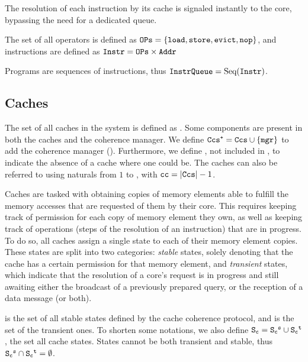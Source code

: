 The resolution of each instruction by its cache is signaled instantly to the
core, bypassing the need for a dedicated queue.

\begin{definition}[Instruction]
The set of all operators is defined as $\text{\texttt{OPs}}{} = \{\text{\texttt{load}}{},
\text{\texttt{store}}{}, \text{\texttt{evict}}{}, \text{\texttt{nop}}{}\}$, and instructions are defined
as $\text{\texttt{Instr}}{} = \text{\texttt{OPs}}{} \times \text{\texttt{Addr}}{}$
\end{definition}

\begin{definition}[Program]
Programs are sequences of instructions, thus $\text{\texttt{InstrQueue}}{} =
\text{Seq}(\text{\texttt{Instr}}{})$.
\end{definition}

\subsection{Caches}
\label{sec:cache_coherence:cache_cmp}
\begin{definition}[Cache]
\label{def:cache}
The set of all caches in the system is defined as \caches{}.  Some components
are present in both the caches and the coherence manager. We define
$\text{\texttt{Ccs\textsuperscript{+}}}{} = \text{\texttt{Ccs}}{} \cup \{\text{\texttt{mgr}}{}\}$ to add the coherence manager
(\cmgr{}). Furthermore, we define \nocache{}, not included in \caches{}, to
indicate the absence of a cache where one could be. The caches can also be
referred to using naturals from $1$ to \cachecount{}, with
$\text{\texttt{cc}}{} = |\text{\texttt{Ccs}}{}| - 1$.
\end{definition}

Caches are tasked with obtaining copies of memory elements able to fulfill the
memory accesses that are requested of them by their core. This requires keeping
track of permission for each copy of memory element they own, as well as
keeping track of operations (steps of the resolution of an instruction) that
are in progress. To do so, all caches assign a single state to each of their
memory element copies. These states are split into two categories:
\textit{stable} states, solely denoting that the cache has a certain permission
for that memory element, and \textit{transient} states, which indicate that the
resolution of a core's request is in progress and still awaiting either the
broadcast of a previously prepared query, or the reception of a data message
(or both).

\begin{definition}
\label{def:cache_state}
\stablecachestate{} is the set of all stable states defined by the cache
coherence protocol, and \transientcachestate{} is the set of the transient
ones.  To shorten some notations, we also define $\text{\texttt{S\textsubscript{c}}}{} =
\text{\texttt{S\textsubscript{c}\textsuperscript{s}}}{} \cup \text{\texttt{S\textsubscript{c}\textsuperscript{t}}}{}$, the set all cache states.
States cannot be both transient and stable, thus $\text{\texttt{S\textsubscript{c}\textsuperscript{s}}}{} \cap
\text{\texttt{S\textsubscript{c}\textsuperscript{t}}}{} = \emptyset$.
\end{definition}

